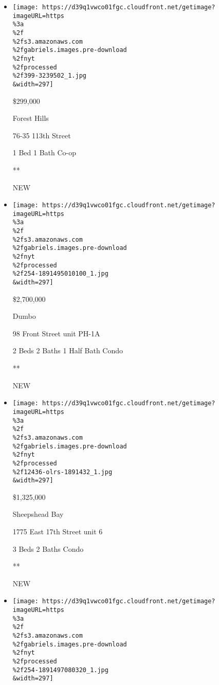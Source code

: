 \begin{itemize}
\item
  \href{/real-estate/usa/ny/queens/forest-hills/homes-for-sale/76-35-113th-street/399-3239502?}{}

  \texttt{[image: https://d39q1vwco01fgc.cloudfront.net/getimage?imageURL=https\\\%3a\\\%2f\\\%2fs3.amazonaws.com\\\%2fgabriels.images.pre-download\\\%2fnyt\\\%2fprocessed\\\%2f399-3239502\_1.jpg\\\&width=297]}

  \$299,000

  Forest Hills

  76-35 113th Street

  1 Bed \textbar{} 1 Bath \textbar{} Co-op

  **

  NEW
\item
  \href{/real-estate/usa/ny/brooklyn/dumbo/homes-for-sale/98-front-street/254-1891495010100?}{}

  \texttt{[image: https://d39q1vwco01fgc.cloudfront.net/getimage?imageURL=https\\\%3a\\\%2f\\\%2fs3.amazonaws.com\\\%2fgabriels.images.pre-download\\\%2fnyt\\\%2fprocessed\\\%2f254-1891495010100\_1.jpg\\\&width=297]}

  \$2,700,000

  Dumbo

  98 Front Street unit PH-1A

  2 Beds \textbar{} 2 Baths \textbar{} 1 Half Bath \textbar{} Condo

  **

  NEW
\item
  \href{/real-estate/usa/ny/brooklyn/sheepshead-bay/homes-for-sale/1775-east-17th-street/12436-OLRS-1891432?}{}

  \texttt{[image: https://d39q1vwco01fgc.cloudfront.net/getimage?imageURL=https\\\%3a\\\%2f\\\%2fs3.amazonaws.com\\\%2fgabriels.images.pre-download\\\%2fnyt\\\%2fprocessed\\\%2f12436-olrs-1891432\_1.jpg\\\&width=297]}

  \$1,325,000

  Sheepshead Bay

  1775 East 17th Street unit 6

  3 Beds \textbar{} 2 Baths \textbar{} Condo

  **

  NEW
\item
  \href{/real-estate/usa/ny/brooklyn/dumbo/homes-for-sale/98-front-street/254-1891497080320?}{}

  \texttt{[image: https://d39q1vwco01fgc.cloudfront.net/getimage?imageURL=https\\\%3a\\\%2f\\\%2fs3.amazonaws.com\\\%2fgabriels.images.pre-download\\\%2fnyt\\\%2fprocessed\\\%2f254-1891497080320\_1.jpg\\\&width=297]}


\end{itemize}
